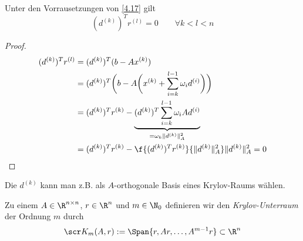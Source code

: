 \documentclass[11pt]{scrbook}
\begin{document}
\begin{lem}[Orthogonalität] \label{4.18}
	Unter den Vorrausetzungen von \ref{4.17} gilt
	\[
		(d^{(k)})^T r^{(l)} = 0
		\qquad \forall k < l < n
	\]
	\begin{proof}
		\begin{align*}
			(d^{(k)})^T r^{(l)}
			&= (d^{(k)})^T (b-Ax^{(k)}) \\
			&= (d^{(k)})^T \bigg( b - A \bigg(x^{(k)} + \sum_{i=k}^{l-1} \omega_i d^{(i)} \bigg) \bigg) \\
			&= (d^{(k)})^T r^{(k)} - \underbrace{(d^{(k)})^T \sum_{i=k}^{l-1} \omega_i A d^{(i)}}_{= \omega_k \|d^{(k)}\|_A^2} \\
			&= (d^{(k)})^T r^{(k)} - \f{(d^{(k)})^T r^{(k)}}{\|d^{(k)}\|_A^2} \|d^{(k)}\|_A^2 = 0
		\end{align*}
	\end{proof}
\end{lem}

Die $d^{(k)}$ kann man z.B. als $A$-orthogonale Basis eines Krylov-Raums wählen.

\begin{df} \label{4.19}
	Zu einem $A \in \R^{n\times n}$, $r\in \R^n$ und $m\in \N_0$ definieren wir den \emph{Krylov-Unterraum} der Ordnung $m$  durch
	\[
		\scr K_m(A, r) := \Span\{ r, Ar, \dotsc, A^{m-1}r \} \subset \R^n
	\]
\end{df}
\end{document}
